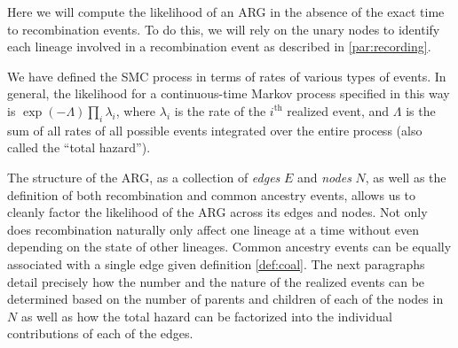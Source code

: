 \documentclass{article}
\newcommand{\comment}[1]{{\it \color{orange} (#1)}}
\begin{document}
Here we will compute the likelihood of an ARG in the absence of the
exact time to recombination events. To do this, we will rely on the unary nodes
to identify each lineage involved in a recombination event as described in \ref{par:recording}.

We have defined the SMC process in terms of rates of various types of events.
In general, the likelihood for a continuous-time Markov process specified in this way
is $\exp(-\Lambda) \prod_i \lambda_i$,
where $\lambda_i$ is the rate of the $i^\text{th}$ realized event,
and $\Lambda$ is the sum of all rates of all possible events
integrated over the entire process
(also called the ``total hazard''). 




The structure of the ARG, as a collection of \emph{edges} $E$ and \emph{nodes} $N$,
as well as the definition of both recombination and common ancestry events, allows us
to cleanly factor the likelihood of the ARG across its edges and nodes.
Not only does recombination
naturally only affect one lineage at a time without even depending
on the state of other lineages. Common ancestry events can be equally
associated with a single edge given definition \ref{def:coal}.
The next paragraphs detail precisely how the number and the nature of the realized events
can be determined based on the number of
parents and children of each of the nodes in $N$ as well as how the total hazard can be
factorized into the individual contributions of each of the edges.
\end{document}
